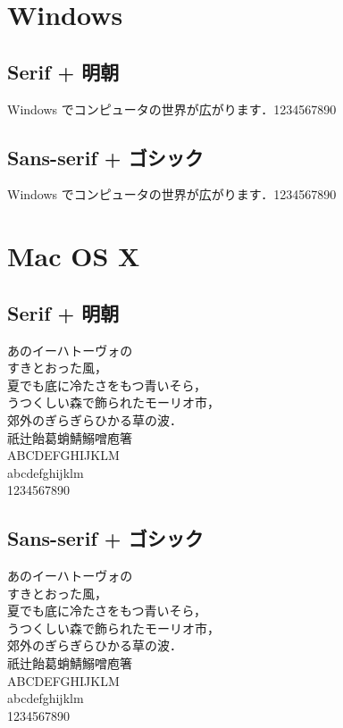﻿\documentclass[a4paper,12pt]{ujreport}
\begin{document}

\chapter*{Windows}

\section*{Serif + 明朝}
\begin{center}
Windows でコンピュータの世界が広がります．1234567890
\end{center}

\section*{Sans-serif + ゴシック}
\begin{center}
\sffamily\gtfamily
Windows でコンピュータの世界が広がります．1234567890
\end{center}


\chapter*{Mac OS X}

\section*{Serif + 明朝}
\begin{center}
あのイーハトーヴォの \\
すきとおった風， \\
夏でも底に冷たさをもつ青いそら， \\
うつくしい森で飾られたモーリオ市， \\
郊外のぎらぎらひかる草の波． \\
祇辻飴葛蛸鯖鰯噌庖箸 \\
ABCDEFGHIJKLM \\
abcdefghijklm \\
1234567890 \\
\end{center}


\section*{Sans-serif + ゴシック}
\begin{center}
\sffamily\gtfamily
あのイーハトーヴォの \\
すきとおった風， \\
夏でも底に冷たさをもつ青いそら， \\
うつくしい森で飾られたモーリオ市， \\
郊外のぎらぎらひかる草の波． \\
祇辻飴葛蛸鯖鰯噌庖箸 \\
ABCDEFGHIJKLM \\
abcdefghijklm \\
1234567890 \\
\end{center}

\end{document}
